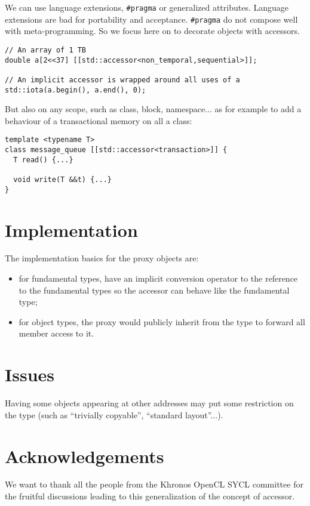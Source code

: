 \documentclass[a4paper]{article}
\begin{document}
We can use language extensions, \lstinline|#pragma| or generalized
attributes. Language extensions are bad for portability and
acceptance. \lstinline|#pragma| do not compose well with
meta-programming. So we focus here on to decorate objects with
accessors.

\begin{lstlisting}
// An array of 1 TB
double a[2<<37] [[std::accessor<non_temporal,sequential>]];

// An implicit accessor is wrapped around all uses of a
std::iota(a.begin(), a.end(), 0);
\end{lstlisting}

But also on any scope, such as class, block, namespace... as for
example to add a behaviour of a transactional memory on all a class:
\begin{lstlisting}
template <typename T>
class message_queue [[std::accessor<transaction>]] {
  T read() {...}

  void write(T &&t) {...}
}
\end{lstlisting}


\section{Implementation}
\label{sec:implementation}

The implementation basics for the proxy objects are:
\begin{itemize}
\item for fundamental types, have an implicit conversion operator to
  the reference to the fundamental types so the accessor can behave
  like the fundamental type;
\item for object types, the proxy would publicly inherit from the type to
  forward all member access to it.
\end{itemize}


\section{Issues}
\label{sec:issues}

Having some objects appearing at other addresses may put some
restriction on the type (such as ``trivially copyable'', ``standard
layout''...).


\section{Acknowledgements}
\label{sec:acknowledgements}

We want to thank all the people from the Khronos OpenCL SYCL committee
for the fruitful discussions leading to this generalization of the
concept of accessor.
\end{document}
